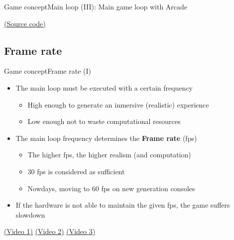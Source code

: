 \documentclass[10pt,compress]{beamer} %
\begin{document}
\begin{frame}[plain]{Game concept}{Main loop (III): Main game loop with Arcade}
	\vspace{-0.2cm}
	\begin{block}{}
		\vspace{-0.2cm}
		
	\end{block}

	\href{https://github.com/pvcraven/arcade/blob/master/arcade/application.py\#L36}{(Source code)}
\end{frame}

\subsection[Frame rate]{Frame rate}
\begin{frame}{Game concept}{Frame rate (I)}
	\begin{itemize}
	\item The main loop must be executed with a certain frequency
		\begin{itemize}
		\item High enough to generate an inmersive (realistic) experience
		\item Low enough not to waste computational resources
		\end{itemize}
	\item The main loop frequency determines the \textbf{Frame rate} (fps)
		\begin{itemize}
		\item The higher fps, the higher realism (and computation)
		\item 30 fps is considered as sufficient
		\item Nowdays, moving to 60 fps on new generation consoles
		\end{itemize}
	\item If the hardware is not able to maintain the given fps, the game suffers slowdown
	\end{itemize}
	\href{https://youtu.be/PLhPvS0hZSs?t=1m21s}{(Video 1)} \href{https://www.youtube.com/watch?v=RzcZAJM6ECQ}{(Video 2)} \href{https://youtu.be/AwnQ6qF8Ots?t=1m38s}{(Video 3)} 
\end{frame}
\end{document}
